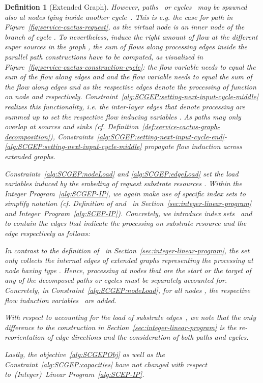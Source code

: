 \documentclass[10pt, conference, letterpaper]{IEEEtran}
\newtheorem{definition}[theorem]{Definition}
\begin{document}
\begin{definition}[Extended Graph]
However, paths~ or cycles~ may be spawned also at nodes lying inside another cycle~. This is e.g. the case for path  in Figure~\ref{fig:service-cactus-request}, as the virtual node  is an inner node of the branch  of cycle . To nevertheless, induce the right amount of flow at the different super sources in the graph , the sum of flows along processing edges inside the \emph{parallel path constructions} have to be computed, as visualized in Figure~\ref{fig:service-cactus-construction-cycle}: the flow variable  needs to equal the sum of the flow along edges  and  and the flow variable  needs to equal the sum of the flow along edges  and  as the respective edges denote the processing of function  on node  and  respectively. Constraint~\ref{alg:SCGEP:setting-next-input-cycle-middle} realizes this functionality, i.e. the inter-layer edges that denote processing are summed up to set the respective flow inducing variables . As paths may only overlap at sources and sinks (cf. Definition~\ref{def:service-cactus-graph-decomposition}), Constraints~\ref{alg:SCGEP:setting-next-input-cycle-end}-\ref{alg:SCGEP:setting-next-input-cycle-middle} propagate flow induction across extended graphs.

Constraints~\ref{alg:SCGEP:nodeLoad} and \ref{alg:SCGEP:edgeLoad} set the load variables  induced by the embeding of request  substrate resources . Within the Integer Program~\ref{alg:SCGEP-IP}, we again make use of specific index sets to simplify notation (cf. Definition of  and~ in Section~\ref{sec:integer-linear-program} and Integer~Program~\ref{alg:SCEP-IP}). Concretely, we introduce index sets~ and~ to contain the edges that indicate the processing on substrate resource   and the edge   respectively as follows:


In contrast to the definition of~ in Section~\ref{sec:integer-linear-program}, the set~ only collects the internal edges of extended graphs representing the processing at node  having type . Hence, processing at nodes that are the start or the target of any of the decomposed paths or cycles must be separately accounted for. Concretely, in Constraint~\ref{alg:SCGEP:nodeLoad}, for all nodes , the respective flow induction variables~ are added. 

With respect to accounting for the load of substrate edges~, we note that the only difference to the construction in Section~\ref{sec:integer-linear-program} is the re-reorientation of edge directions and the consideration of both paths and cycles. 

Lastly, the objective~\ref{alg:SCGEPObj} as well as the Constraint~\ref{alg:SCGEP:capacities} have not changed with respect to~(Integer)~Linear Program~\ref{alg:SCEP-IP}.


\end{definition}
\end{document}
